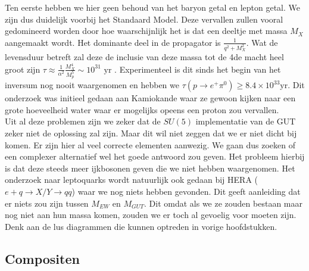 \documentclass[../main.tex]{subfiles}
\begin{document}
Ten eerste hebben we hier geen behoud van het baryon getal en lepton getal. We zijn dus duidelijk voorbij het Standaard Model. Deze vervallen zullen vooral gedomineerd worden door hoe waarschijnlijk het is dat een deeltje met massa $M_X$ aangemaakt wordt. Het dominante deel in de propagator is $\frac{1}{q^{2}+M_{X}^{2}}$. Wat de levensduur betreft zal deze de inclusie van deze massa tot de 4de macht heel groot zijn $\tau \approx \frac{1}{\alpha^{2}} \frac{M_{X}^{4}}{M_{p}^{5}} \sim 10^{31} \text { yr }$. Experimenteel is dit sinds het begin van het inversum nog nooit waargenomen en hebben we $\tau\left(p \rightarrow e^{+} \pi^{0}\right) \geq 8.4 \times 10^{33} \text{yr}$. Dit onderzoek was initieel gedaan aan Kamiokande waar ze gewoon kijken naar een grote hoeveelheid water waar er mogelijks opeens een proton zou vervallen.\\
Uit al deze problemen zijn we zeker dat de $SU(5)$ implementatie van de GUT zeker niet de oplossing zal zijn. Maar dit wil niet zeggen dat we er niet dicht bij komen. Er zijn hier al veel correcte elementen aanwezig. We gaan dus zoeken of een complexer alternatief wel het goede antwoord zou geven. Het probleem hierbij is dat deze steeds meer ijkbosonen geven die we niet hebben waargenomen. Het onderzoek naar leptoquarks wordt natuurlijk ook gedaan bij HERA ($e+q \rightarrow X / Y \rightarrow q q$) waar we nog niets hebben gevonden. Dit geeft aanleiding dat er niets zou zijn tussen $M_{EW}$ en $M_{GUT}$. Dit omdat als we ze zouden bestaan maar nog niet aan hun massa komen, zouden we er toch al gevoelig voor moeten zijn. Denk aan de lus diagrammen die kunnen optreden in vorige hoofdstukken.

\subsection{Compositen}%
\label{sub:compositen}
\end{document}
